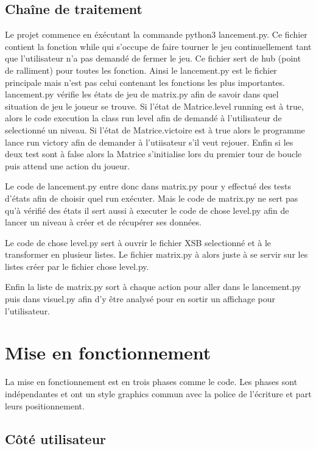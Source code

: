 \documentclass[a4paper,12pt]{article} %
\begin{document}
\newpage

\subsection{Chaîne de traitement}

Le projet commence en éxécutant la commande python3 lancement.py.
Ce fichier contient la fonction while qui s'occupe de faire tourner le jeu continuellement tant que l'utilisateur n'a pas demandé de fermer le jeu.
Ce fichier sert de hub (point de ralliment) pour toutes les fonction.
Ainsi le lancement.py est le fichier principale mais n'est pas celui contenant les fonctions les plus importantes.
lancement.py vérifie les états de jeu de matrix.py afin de savoir dans quel situation de jeu le joueur se trouve.
Si l'état de Matrice.level running est à true, alors le code execution la class run level afin de demandé à l'utilisateur de selectionné un niveau.
Si l'état de Matrice.victoire est à true alors le programme lance run victory afin de demander à l'utiisateur s'il veut rejouer.
Enfin si les deux test sont à false alors la Matrice s'initialise lors du premier tour de boucle puis attend une action du joueur. 

Le code de lancement.py entre donc dans matrix.py pour y effectué des tests d'états afin de choisir quel run exécuter.
Mais le code de matrix.py ne sert pas qu'à vérifié des états il sert aussi à executer le code de chose level.py afin de lancer un niveau à créer et de récupérer ses données.

Le code de chose level.py sert à ouvrir le fichier XSB selectionné et à le transformer en plusieur listes.
Le fichier matrix.py à alors juste à se servir sur les listes créer par le fichier chose level.py.

Enfin la liste de matrix.py sort à chaque action pour aller dans le lancement.py puis dans visuel.py afin d'y être analysé pour en sortir un affichage pour l'utilisateur.

\newpage

\section{Mise en fonctionnement}

La mise en fonctionnement est en trois phases comme le code.
Les phases sont indépendantes et ont un style graphics commun avec la police de l'écriture et part leurs positionnement.

\subsection{Côté utilisateur}
\end{document}
